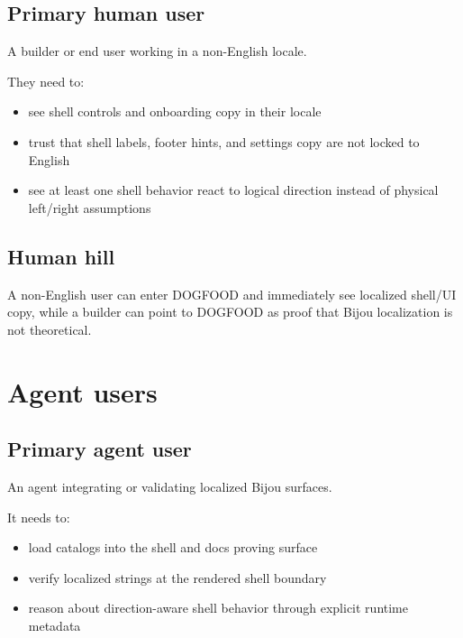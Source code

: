 \subsection{Primary human user}\label{record-194-primary-human-user}

A builder or end user working in a non-English locale.

They need to:

\begin{itemize}
\tightlist
\item
  see shell controls and onboarding copy in their locale
\item
  trust that shell labels, footer hints, and settings copy are not locked to English
\item
  see at least one shell behavior react to logical direction instead of physical left/right assumptions
\end{itemize}

\subsection{Human hill}\label{record-194-human-hill}

A non-English user can enter DOGFOOD and immediately see localized shell/UI copy, while a builder can point to DOGFOOD as proof that Bijou localization is not theoretical.

\section{Agent users}\label{record-194-agent-users}

\subsection{Primary agent user}\label{record-194-primary-agent-user}

An agent integrating or validating localized Bijou surfaces.

It needs to:

\begin{itemize}
\tightlist
\item
  load catalogs into the shell and docs proving surface
\item
  verify localized strings at the rendered shell boundary
\item
  reason about direction-aware shell behavior through explicit runtime metadata
\end{itemize}


